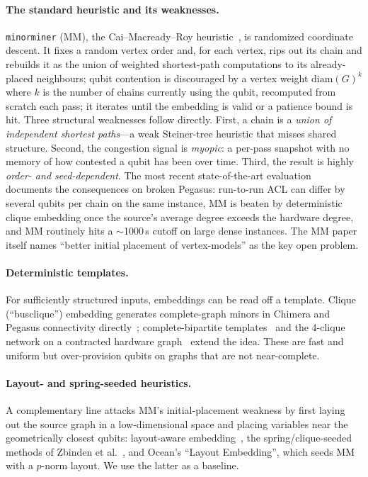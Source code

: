 \documentclass[acmsmall,anonymous,nonacm]{acmart}
\begin{document}
\paragraph{The standard heuristic and its weaknesses.}
\texttt{minorminer} (MM), the Cai--Macready--Roy heuristic~\cite{cai2014minorminer},
is randomized coordinate descent. It fixes a random vertex order and, for each
vertex, rips out its chain and rebuilds it as the union of weighted
shortest-path computations to its already-placed neighbours; qubit contention is
discouraged by a vertex weight $\mathrm{diam}(G)^{k}$ where $k$ is the number of
chains currently using the qubit, recomputed from scratch each pass; it iterates
until the embedding is valid or a patience bound is hit. Three structural
weaknesses follow directly. First, a chain is a \emph{union of independent
shortest paths}---a weak Steiner-tree heuristic that misses shared structure.
Second, the congestion signal is \emph{myopic}: a per-pass snapshot with no
memory of how contested a qubit has been over time. Third, the result is highly
\emph{order- and seed-dependent}. The most recent state-of-the-art
evaluation~\cite{gomez2025eval} documents the consequences on broken Pegasus:
run-to-run ACL can differ by several qubits per chain on the same instance, MM is
beaten by deterministic clique embedding once the source's average degree
exceeds the hardware degree, and MM routinely hits a $\sim$1000\,s cutoff on
large dense instances. The MM paper itself names ``better initial placement of
vertex-models'' as the key open problem.

\paragraph{Deterministic templates.}
For sufficiently structured inputs, embeddings can be read off a template.
Clique (``busclique'') embedding generates complete-graph minors in Chimera and
Pegasus connectivity directly~\cite{boothby2016clique}; complete-bipartite
templates~\cite{sinno2025bipartite} and the 4-clique network on a contracted
hardware graph~\cite{pelofske2024fourclique} extend the idea. These are fast and
uniform but over-provision qubits on graphs that are not near-complete.

\paragraph{Layout- and spring-seeded heuristics.}
A complementary line attacks MM's initial-placement weakness by first laying out
the source graph in a low-dimensional space and placing variables near the
geometrically closest qubits: layout-aware embedding~\cite{pinilla2019layout},
the spring/clique-seeded methods of Zbinden et al.~\cite{zbinden2020embedding},
and Ocean's ``Layout Embedding'', which seeds MM with a $p$-norm layout. We use
the latter as a baseline.
\end{document}
